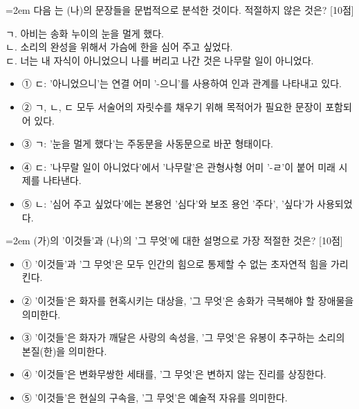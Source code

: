 \documentclass[10pt,a4paper]{article}
\newcommand{\qnum}[1]{%
  \tikz[baseline=(num.base)]{%
    \node[circle, fill=numCircle, text=white, inner sep=0pt,
          minimum size=18pt, font=\small\bfseries] (num) {#1};%
  }%
}
\newcommand{\pts}[1]{%
  \hfill\textcolor{ptsBadge}{[#1점]}%
}
\begin{document}
\vspace{4mm}
\begin{minipage}{\columnwidth}
{\hangindent=2em
\qnum{37}\enspace 다음 는 (나)의 문장들을 문법적으로 분석한 것이다. 적절하지 않은 것은? \pts{10}
\par}

\vspace{3mm}
\begin{tcolorbox}[bogi]
ㄱ. 아비는 송화 누이의 눈을 멀게 했다. \\{}
ㄴ. 소리의 완성을 위해서 가슴에 한을 심어 주고 싶었다. \\{}
ㄷ. 너는 내 자식이 아니었으니 나를 버리고 나간 것은 나무랄 일이 아니었다.
\end{tcolorbox}
\vspace{3mm}
\begin{itemize}[leftmargin=2.5em, labelsep=0.3em, label={}, itemsep=4pt, parsep=1pt, topsep=0pt]
  \item ① ㄷ: '아니었으니'는 연결 어미 '-으니'를 사용하여 인과 관계를 나타내고 있다.
  \item ② ㄱ, ㄴ, ㄷ 모두 서술어의 자릿수를 채우기 위해 목적어가 필요한 문장이 포함되어 있다.
  \item ③ ㄱ: '눈을 멀게 했다'는 주동문을 사동문으로 바꾼 형태이다.
  \item ④ ㄷ: '나무랄 일이 아니었다'에서 '나무랄'은 관형사형 어미 '-ㄹ'이 붙어 미래 시제를 나타낸다.
  \item ⑤ ㄴ: '심어 주고 싶었다'에는 본용언 '심다'와 보조 용언 '주다', '싶다'가 사용되었다.
\end{itemize}
\end{minipage}
\vspace{4mm}

\vspace{4mm}
\begin{minipage}{\columnwidth}
{\hangindent=2em
\qnum{38}\enspace (가)의 '이것들'과 (나)의 '그 무엇'에 대한 설명으로 가장 적절한 것은? \pts{10}
\par}

\vspace{3mm}
\begin{itemize}[leftmargin=2.5em, labelsep=0.3em, label={}, itemsep=4pt, parsep=1pt, topsep=0pt]
  \item ① '이것들'과 '그 무엇'은 모두 인간의 힘으로 통제할 수 없는 초자연적 힘을 가리킨다.
  \item ② '이것들'은 화자를 현혹시키는 대상을, '그 무엇'은 송화가 극복해야 할 장애물을 의미한다.
  \item ③ '이것들'은 화자가 깨달은 사랑의 속성을, '그 무엇'은 유봉이 추구하는 소리의 본질(한)을 의미한다.
  \item ④ '이것들'은 변화무쌍한 세태를, '그 무엇'은 변하지 않는 진리를 상징한다.
  \item ⑤ '이것들'은 현실의 구속을, '그 무엇'은 예술적 자유를 의미한다.
\end{itemize}
\end{minipage}
\vspace{4mm}
\end{document}
